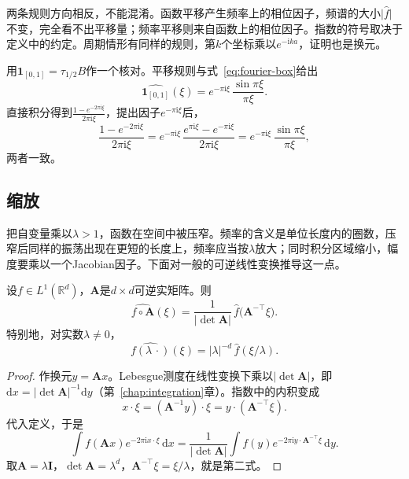 两条规则方向相反，不能混淆。函数平移产生频率上的相位因子，频谱的大小$\lvert\widehat f\rvert$不变，完全看不出平移量；频率平移则来自函数上的相位因子。指数的符号取决于定义中的约定。周期情形有同样的规则，第$k$个坐标乘以$e^{-\mathrm ika}$，证明也是换元。

用$\mathbf 1_{[0,1]}=\tau_{1/2}B$作一个核对。平移规则与式~\eqref{eq:fourier-box}给出
\[
\widehat{\mathbf 1_{[0,1]}}(\xi)=e^{-\pi\mathrm i\xi}\,\frac{\sin\pi\xi}{\pi\xi}.
\]
直接积分得到$\frac{1-e^{-2\pi\mathrm i\xi}}{2\pi\mathrm i\xi}$，提出因子$e^{-\pi\mathrm i\xi}$后，
\[
\frac{1-e^{-2\pi\mathrm i\xi}}{2\pi\mathrm i\xi}=e^{-\pi\mathrm i\xi}\,\frac{e^{\pi\mathrm i\xi}-e^{-\pi\mathrm i\xi}}{2\pi\mathrm i\xi}=e^{-\pi\mathrm i\xi}\,\frac{\sin\pi\xi}{\pi\xi},
\]
两者一致。

\subsection{缩放}
\label{sec:fourier-scaling}

把自变量乘以$\lambda>1$，函数在空间中被压窄。频率的含义是单位长度内的圈数，压窄后同样的振荡出现在更短的长度上，频率应当按$\lambda$放大；同时积分区域缩小，幅度要乘以一个Jacobian因子。下面对一般的可逆线性变换推导这一点。

\begin{theorem}[线性变量替换]
\label{thm:fourier-scaling}
设$f\in L^1(\mathbb R^d)$，$\bm A$是$d\times d$可逆实矩阵。则
\begin{equation}
\widehat{f\circ\bm A}(\xi)=\frac1{\lvert\det\bm A\rvert}\,\widehat f\bigl(\bm A^{-\top}\xi\bigr).
\label{eq:fourier-linear-change}
\end{equation}
特别地，对实数$\lambda\neq0$，
\begin{equation}
\widehat{f(\lambda\,\cdot)}(\xi)=\lvert\lambda\rvert^{-d}\,\widehat f(\xi/\lambda).
\label{eq:fourier-scaling}
\end{equation}
\end{theorem}

\begin{proof}
作换元$y=\bm Ax$。Lebesgue测度在线性变换下乘以$\lvert\det\bm A\rvert$，即$\mathrm dx=\lvert\det\bm A\rvert^{-1}\mathrm dy$（第~\ref{chap:integration}章）。指数中的内积变成
\[
x\cdot\xi=(\bm A^{-1}y)\cdot\xi=y\cdot(\bm A^{-\top}\xi).
\]
代入定义，于是
\[
\int f(\bm Ax)e^{-2\pi\mathrm ix\cdot\xi}\,\mathrm dx=\frac1{\lvert\det\bm A\rvert}\int f(y)e^{-2\pi\mathrm iy\cdot\bm A^{-\top}\xi}\,\mathrm dy.
\]
取$\bm A=\lambda\bm I$，$\det\bm A=\lambda^d$，$\bm A^{-\top}\xi=\xi/\lambda$，就是第二式。
\end{proof}


